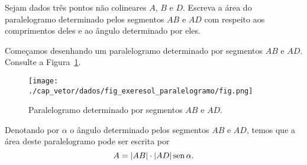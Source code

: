 \begin{exeresol}
  Sejam dados três pontos não colineares $A$, $B$ e $D$. Escreva a área do paralelogramo determinado pelos segmentos $AB$ e $AD$ com respeito aos comprimentos deles e ao ângulo determinado por eles.
\end{exeresol}
\begin{resol}
  Começamos desenhando um paralelogramo determinado por segmentos $AB$ e $AD$. Consulte a Figura~\ref{cap_vetor_sec_segorien:fig:exeresol_paralelogramo}.

  \begin{figure}[H]
    \centering
    \texttt{[image: ./cap\_vetor/dados/fig\_exeresol\_paralelogramo/fig.png]}
    \caption{Paralelogramo determinado por segmentos $AB$ e $AD$.}
    \label{cap_vetor_sec_segorien:fig:exeresol_paralelogramo}
  \end{figure}

  Denotando por $\alpha$ o ângulo determinado pelos segmentos $AB$ e $AD$, temos que a área deste paralelogramo pode ser escrita por
  \begin{equation}
    A = |AB|\cdot |AD| \operatorname{sen} \alpha.
  \end{equation}
\end{resol}

